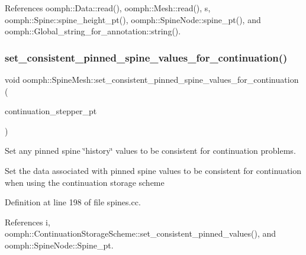 References oomph\+::\+Data\+::read(), oomph\+::\+Mesh\+::read(), s, oomph\+::\+Spine\+::spine\+\_\+height\+\_\+pt(), oomph\+::\+Spine\+Node\+::spine\+\_\+pt(), and oomph\+::\+Global\+\_\+string\+\_\+for\+\_\+annotation\+::string().

\mbox{\label{classoomph_1_1SpineMesh_a0ec20ffa3e78435f8daa087147900d9a}} 
\subsubsection{\texorpdfstring{set\+\_\+consistent\+\_\+pinned\+\_\+spine\+\_\+values\+\_\+for\+\_\+continuation()}{set\_consistent\_pinned\_spine\_values\_for\_continuation()}}
{\footnotesize\ttfamily void oomph\+::\+Spine\+Mesh\+::set\+\_\+consistent\+\_\+pinned\+\_\+spine\+\_\+values\+\_\+for\+\_\+continuation (\begin{DoxyParamCaption}\item[{\hyperlink{classoomph_1_1ContinuationStorageScheme}{Continuation\+Storage\+Scheme} $\ast$const \&}]{continuation\+\_\+stepper\+\_\+pt }\end{DoxyParamCaption})}



Set any pinned spine \char`\"{}history\char`\"{} values to be consistent for continuation problems. 

Set the data associated with pinned spine values to be consistent for continuation when using the continuation storage scheme 

Definition at line 198 of file spines.\+cc.



References i, oomph\+::\+Continuation\+Storage\+Scheme\+::set\+\_\+consistent\+\_\+pinned\+\_\+values(), and oomph\+::\+Spine\+Node\+::\+Spine\+\_\+pt.

\mbox{\label{classoomph_1_1SpineMesh_ad858479b2509532604bc48a184ad55a9}} 
